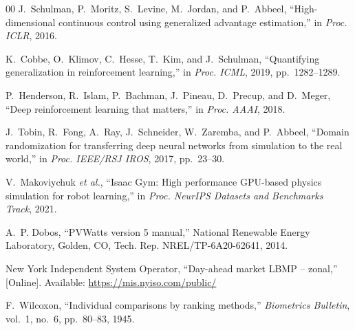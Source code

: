 \documentclass[conference]{IEEEtran}
\begin{document}
\begin{thebibliography}{00}
J.~Schulman, P.~Moritz, S.~Levine, M.~Jordan, and P.~Abbeel, ``High-dimensional
continuous control using generalized advantage estimation,'' in \emph{Proc.
ICLR}, 2016.

K.~Cobbe, O.~Klimov, C.~Hesse, T.~Kim, and J.~Schulman, ``Quantifying
generalization in reinforcement learning,'' in \emph{Proc. ICML}, 2019,
pp.~1282--1289.

P.~Henderson, R.~Islam, P.~Bachman, J.~Pineau, D.~Precup, and D.~Meger, ``Deep
reinforcement learning that matters,'' in \emph{Proc. AAAI}, 2018.

J.~Tobin, R.~Fong, A.~Ray, J.~Schneider, W.~Zaremba, and P.~Abbeel, ``Domain
randomization for transferring deep neural networks from simulation to the
real world,'' in \emph{Proc. IEEE/RSJ IROS}, 2017, pp.~23--30.

V.~Makoviychuk \emph{et al.}, ``Isaac Gym: High performance GPU-based physics
simulation for robot learning,'' in \emph{Proc. NeurIPS Datasets and
Benchmarks Track}, 2021.

A.~P. Dobos, ``PVWatts version 5 manual,'' National Renewable Energy
Laboratory, Golden, CO, Tech. Rep. NREL/TP-6A20-62641, 2014.

New York Independent System Operator, ``Day-ahead market LBMP -- zonal,''
[Online]. Available: \url{https://mis.nyiso.com/public/}

F.~Wilcoxon, ``Individual comparisons by ranking methods,'' \emph{Biometrics
Bulletin}, vol.~1, no.~6, pp.~80--83, 1945.

\end{thebibliography}
\end{document}
